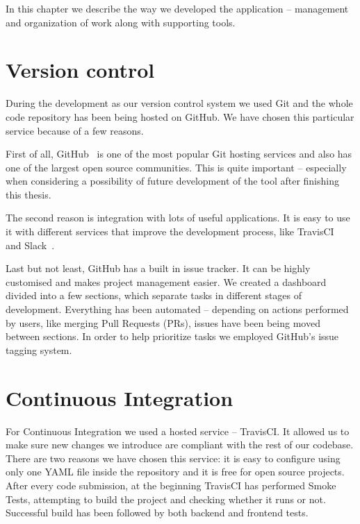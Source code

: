 \documentclass[licencjacka,en]{thesisclass}
\begin{document}
    In this chapter we describe the way we developed
    the application -- management and organization of work along with supporting tools.

    \section{Version control}

    During the development as our version control system we used Git
    and the whole code repository has been being hosted on GitHub.
    We have chosen this particular service because of a few reasons.

    First of all, GitHub~\cite{GitHub} is one of the most popular Git hosting services
    and also has one of the largest open source communities.
    This is quite important -- especially when considering a possibility of
    future development of the tool after finishing this thesis.

    The second reason is integration with lots of useful applications.
    It is easy to use it with different services that improve the development
    process, like TravisCI~\cite{TravisCI} and Slack~\cite{Slack}.

    Last but not least, GitHub has a built in issue tracker.
    It can be highly customised and makes project management easier.
    We created a dashboard divided into a few sections, which separate tasks
    in different stages of development.
    Everything has been automated -- depending on actions performed by users,
    like merging Pull Requests (PRs), issues have been being moved between sections.
    In order to help prioritize tasks we employed GitHub's issue tagging system.

    \section{Continuous Integration}

    For Continuous Integration we used a hosted service -- TravisCI.
    It allowed us to make sure new changes we introduce
    are compliant with the rest of our codebase.
    There are two reasons we have chosen this service:
    it is easy to configure using only one YAML file
    inside the repository and it is free for open source projects.
    After every code submission, at the beginning TravisCI
    has performed Smoke Tests, attempting to build the project
    and checking whether it runs or not.
    Successful build has been followed by both backend and frontend tests.
\end{document}
